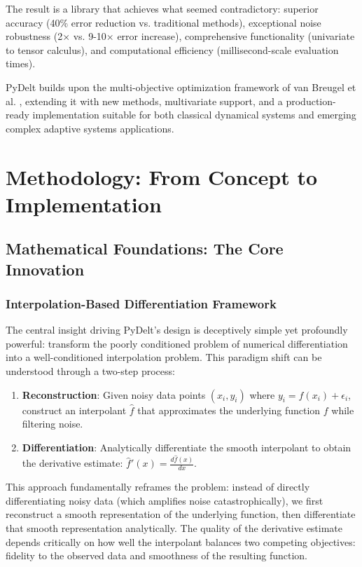 \documentclass[10pt,journal,compsoc]{IEEEtran}
\begin{document}
The result is a library that achieves what seemed contradictory: superior accuracy (40\% error reduction vs. traditional methods), exceptional noise robustness (2× vs. 9-10× error increase), comprehensive functionality (univariate to tensor calculus), and computational efficiency (millisecond-scale evaluation times).

PyDelt builds upon the multi-objective optimization framework of van Breugel et al. \cite{van2021numerical}, extending it with new methods, multivariate support, and a production-ready implementation suitable for both classical dynamical systems and emerging complex adaptive systems applications.

\section{Methodology: From Concept to Implementation}

\subsection{Mathematical Foundations: The Core Innovation}

\subsubsection{Interpolation-Based Differentiation Framework}

The central insight driving PyDelt's design is deceptively simple yet profoundly powerful: transform the poorly conditioned problem of numerical differentiation into a well-conditioned interpolation problem. This paradigm shift can be understood through a two-step process:

\begin{enumerate}
    \item \textbf{Reconstruction}: Given noisy data points $(x_i, y_i)$ where $y_i = f(x_i) + \epsilon_i$, construct an interpolant $\hat{f}$ that approximates the underlying function $f$ while filtering noise.
    
    \item \textbf{Differentiation}: Analytically differentiate the smooth interpolant to obtain the derivative estimate: $\hat{f}'(x) = \frac{d\hat{f}(x)}{dx}$.
\end{enumerate}

This approach fundamentally reframes the problem: instead of directly differentiating noisy data (which amplifies noise catastrophically), we first reconstruct a smooth representation of the underlying function, then differentiate that smooth representation analytically. The quality of the derivative estimate depends critically on how well the interpolant balances two competing objectives: fidelity to the observed data and smoothness of the resulting function.
\end{document}
